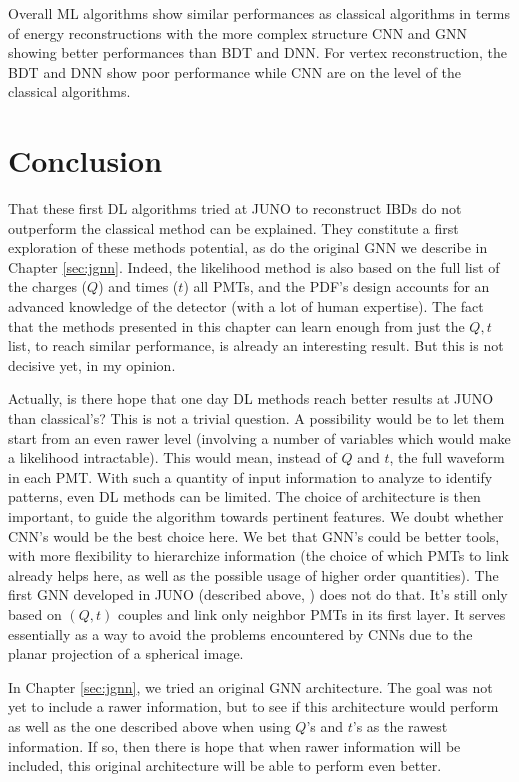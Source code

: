 \documentclass[../main.tex]{subfiles}
\begin{document}
Overall ML algorithms show similar performances as classical algorithms in terms of energy reconstructions with the more complex structure CNN and GNN showing better performances than BDT and DNN. For vertex reconstruction, the BDT and DNN show poor performance while CNN are on the level of the classical algorithms.

\section{Conclusion}

That these first DL algorithms tried at JUNO to reconstruct IBDs do not outperform the classical method can be explained. They constitute a first exploration of these methods potential, as do the original GNN we describe in Chapter \ref{sec:jgnn}. Indeed, the likelihood method is also based on the full list of the charges ($Q$) and times ($t$) all PMTs, and the PDF's design accounts for an advanced knowledge of the detector (with a lot of human expertise). The fact that the methods presented in this chapter can learn enough from just the $Q,t$ list, to reach similar performance, is already an interesting result. But this is not decisive yet, in my opinion.

Actually, is there hope that one day DL methods reach better results at JUNO than classical's? This is not a trivial question. A possibility would be to let them start from an even rawer level (involving a number of variables which would make a likelihood intractable). This would mean, instead of $Q$ and $t$, the full waveform in each PMT. With such a quantity of input information to analyze to identify patterns, even DL methods can be limited. The choice of architecture is then important, to guide the algorithm towards pertinent features. We doubt whether CNN's would be the best choice here. We bet that GNN's could be better tools, with more flexibility to hierarchize information (the choice of which PMTs to link already helps here, as well as the possible usage of higher order quantities). The first GNN developed in JUNO (described above, \cite{qian_vertex_2021}) does not do that. It's still only based on $(Q,t)$ couples and link only neighbor PMTs in its first layer. It serves essentially as a way to avoid the problems encountered by CNNs due to the planar projection of a spherical image.

In Chapter \ref{sec:jgnn}, we tried an original GNN architecture. The goal was not yet to include a rawer information, but to see if this architecture would perform as well as the one described above when using $Q$'s and $t$'s as the rawest information. If so, then there is hope that when rawer information will be included, this original architecture will be able to perform even better.
\end{document}
